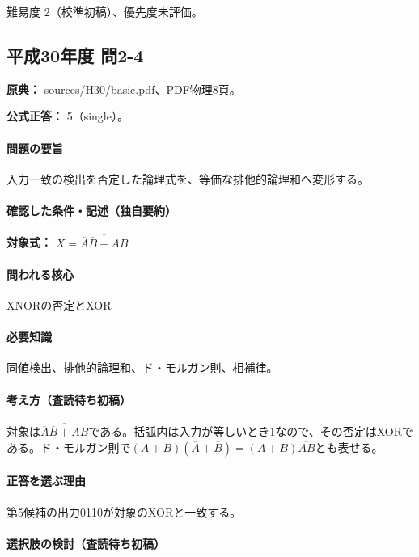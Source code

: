 \par 難易度 2（校準初稿）、優先度未評価。

\subsection{平成30年度 問2-4}
\label{q:h30-reg-basic-2-4}

\noindent\textbf{原典：} sources/H30/basic.pdf、PDF物理8頁。

\textbf{公式正答：} 5（single）。

\paragraph{問題の要旨} 入力一致の検出を否定した論理式を、等価な排他的論理和へ変形する。

\paragraph{確認した条件・記述（独自要約）}\mbox{}\par

\noindent\textbf{対象式：} \(X=\overline{\overline A\overline B+AB}\)\par

\paragraph{問われる核心} XNORの否定とXOR

\paragraph{必要知識} 同値検出、排他的論理和、ド・モルガン則、相補律。

\paragraph{考え方（査読待ち初稿）} 対象は\(\overline{\overline A\overline B+AB}\)である。括弧内は入力が等しいとき1なので、その否定はXORである。ド・モルガン則で\((A+B)(\overline A+\overline B)=(A+B)\overline{AB}\)とも表せる。

\paragraph{正答を選ぶ理由} 第5候補の出力0110が対象のXORと一致する。

\paragraph{選択肢の検討（査読待ち初稿）}\mbox{}\par

